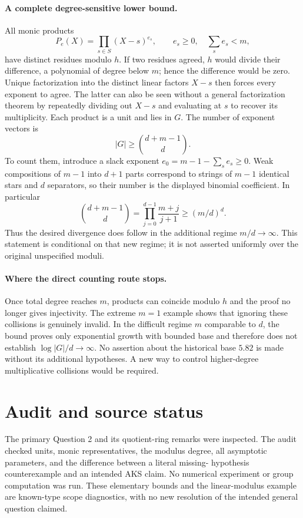 \documentclass[11pt]{article}
\begin{document}
\paragraph{A complete degree-sensitive lower bound.}
All monic products
\[
P_e(X)=\prod_{s\in S}(X-s)^{e_s},\qquad
 e_s\ge0,\quad\sum_s e_s<m,
\]
have distinct residues modulo $h$. If two residues agreed, $h$ would
divide their difference, a polynomial of degree below $m$; hence the
difference would be zero. Unique factorization into the distinct
linear factors $X-s$ then forces every exponent to agree. The latter
can also be seen without a general factorization theorem by repeatedly
dividing out $X-s$ and evaluating at $s$ to recover its multiplicity.
Each product is a unit and lies in $G$. The number of exponent vectors
is
\[
|G|\ge\binom{d+m-1}{d}.
\]
To count them, introduce a slack exponent
$e_0=m-1-\sum_s e_s\ge0$. Weak compositions of $m-1$ into $d+1$
parts correspond to strings of $m-1$ identical stars and $d$ separators,
so their number is the displayed binomial coefficient.
In particular
\[
\binom{d+m-1}{d}=\prod_{j=0}^{d-1}\frac{m+j}{j+1}
 \ge(m/d)^d.
\]
Thus the desired divergence does follow in the additional regime
$m/d\to\infty$. This statement is conditional on that new regime;
it is not asserted uniformly over the original unspecified moduli.

\paragraph{Where the direct counting route stops.}
Once total degree reaches $m$, products can coincide modulo $h$ and
the proof no longer gives injectivity. The extreme $m=1$ example shows
that ignoring these collisions is genuinely invalid. In the difficult
regime $m$ comparable to $d$, the bound proves only exponential growth
with bounded base and therefore does not establish
$\log|G|/d\to\infty$. No assertion about the historical base $5.82$
is made without its additional hypotheses. A new way to control
higher-degree multiplicative collisions would be required.

\section{Audit and source status}
The primary Question 2 and its quotient-ring remarks were inspected.
The audit checked units, monic representatives, the modulus degree,
all asymptotic parameters, and the difference between a literal missing-
hypothesis counterexample and an intended AKS claim. No numerical
experiment or group computation was run. These elementary bounds and
the linear-modulus example are known-type scope diagnostics, with no
new resolution of the intended general question claimed.
\end{document}
